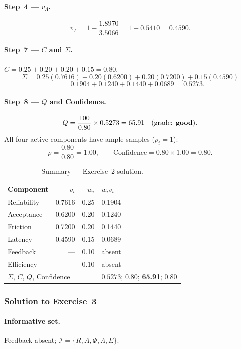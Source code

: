 \documentclass[11pt,a4paper]{article}
\newcommand{\calI}{\mathcal{I}}
\begin{document}
\paragraph{Step~4 --- $v_\Lambda$.}
\[
  v_\Lambda = 1 - \frac{1.8970}{3.5066} = 1 - 0.5410 = 0.4590.
\]

\paragraph{Step~7 --- $C$ and $\Sigma$.}
$C = 0.25+0.20+0.20+0.15 = 0.80$.
\[
  \Sigma = 0.25(0.7616)+0.20(0.6200)+0.20(0.7200)+0.15(0.4590)
\]
\[
  \phantom{\Sigma}= 0.1904+0.1240+0.1440+0.0689 = 0.5273.
\]

\paragraph{Step~8 --- $Q$ and Confidence.}
\[
  Q = \frac{100}{0.80}\times0.5273 = 65.91 \quad (\text{grade: \textbf{good}}).
\]
All four active components have ample samples ($\rho_i=1$):
\[
  \rho = \frac{0.80}{0.80} = 1.00, \qquad \text{Confidence} = 0.80\times1.00 = 0.80.
\]

\begin{table}[h!]
\centering
\caption{Summary --- Exercise~2 solution.}
\begin{tabular}{@{}lrrl@{}}
\toprule
Component & $v_i$ & $w_i$ & $w_iv_i$ \\
\midrule
Reliability  & 0.7616 & 0.25 & 0.1904 \\
Acceptance   & 0.6200 & 0.20 & 0.1240 \\
Friction     & 0.7200 & 0.20 & 0.1440 \\
Latency      & 0.4590 & 0.15 & 0.0689 \\
Feedback     & ---    & 0.10 & absent \\
Efficiency   & ---    & 0.10 & absent \\
\midrule
\multicolumn{3}{l}{$\Sigma$, $C$, $Q$, Confidence}
  & $0.5273$;\; $0.80$;\; \textbf{65.91};\; $0.80$ \\
\bottomrule
\end{tabular}
\end{table}

\subsubsection*{Solution to Exercise~3}

\paragraph{Informative set.}
Feedback absent; $\calI=\{R,A,\Phi,\Lambda,E\}$.
\end{document}
